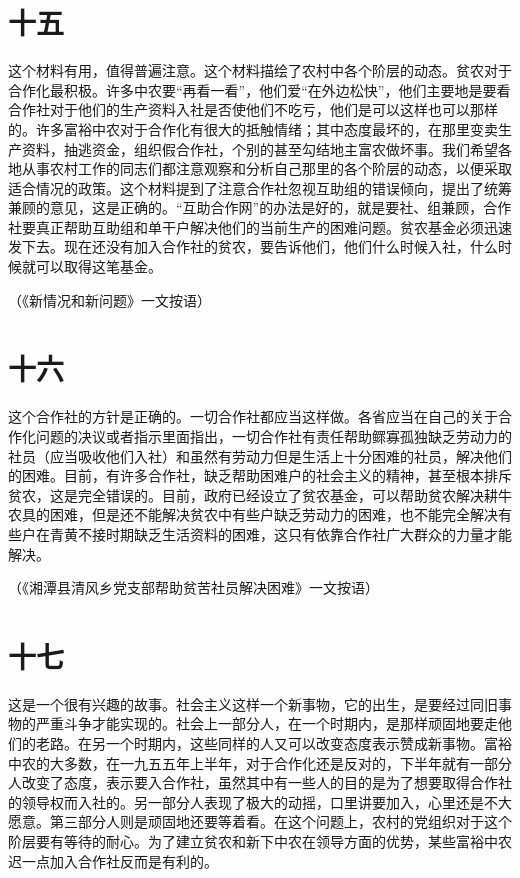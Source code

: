 \section*{十五}

这个材料有用，值得普遍注意。这个材料描绘了农村中各个阶层的动态。贫农对于合作化最积极。许多中农要“再看一看”，他们爱“在外边松快”，他们主要地是要看合作社对于他们的生产资料入社是否使他们不吃亏，他们是可以这样也可以那样的。许多富裕中农对于合作化有很大的抵触情绪；其中态度最坏的，在那里变卖生产资料，抽逃资金，组织假合作社，个别的甚至勾结地主富农做坏事。我们希望各地从事农村工作的同志们都注意观察和分析自己那里的各个阶层的动态，以便采取适合情况的政策。这个材料提到了注意合作社忽视互助组的错误倾向，提出了统筹兼顾的意见，这是正确的。“互助合作网”的办法是好的，就是要社、组兼顾，合作社要真正帮助互助组和单干户解决他们的当前生产的困难问题。贫农基金必须迅速发下去。现在还没有加入合作社的贫农，要告诉他们，他们什么时候入社，什么时候就可以取得这笔基金。


（《新情况和新问题》一文按语）

\section*{十六}

这个合作社的方针是正确的。一切合作社都应当这样做。各省应当在自己的关于合作化问题的决议或者指示里面指出，一切合作社有责任帮助鳏寡孤独缺乏劳动力的社员（应当吸收他们入社）和虽然有劳动力但是生活上十分困难的社员，解决他们的困难。目前，有许多合作社，缺乏帮助困难户的社会主义的精神，甚至根本排斥贫农，这是完全错误的。目前，政府已经设立了贫农基金，可以帮助贫农解决耕牛农具的困难，但是还不能解决贫农中有些户缺乏劳动力的困难，也不能完全解决有些户在青黄不接时期缺乏生活资料的困难，这只有依靠合作社广大群众的力量才能解决。


（《湘潭县清风乡党支部帮助贫苦社员解决困难》一文按语）

\section*{十七}

这是一个很有兴趣的故事。社会主义这样一个新事物，它的出生，是要经过同旧事物的严重斗争才能实现的。社会上一部分人，在一个时期内，是那样顽固地要走他们的老路。在另一个时期内，这些同样的人又可以改变态度表示赞成新事物。富裕中农的大多数，在一九五五年上半年，对于合作化还是反对的，下半年就有一部分人改变了态度，表示要入合作社，虽然其中有一些人的目的是为了想要取得合作社的领导权而入社的。另一部分人表现了极大的动摇，口里讲要加入，心里还是不大愿意。第三部分人则是顽固地还要等着看。在这个问题上，农村的党组织对于这个阶层要有等待的耐心。为了建立贫农和新下中农在领导方面的优势，某些富裕中农迟一点加入合作社反而是有利的。


